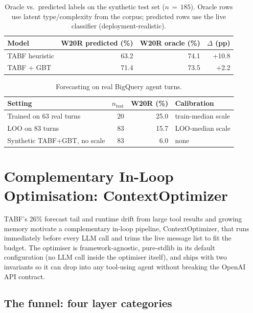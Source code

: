 \documentclass{article}
\begin{document}
\begin{table}[!htbp]
  \caption{Oracle vs.\ predicted labels on the synthetic test set ($n\,{=}\,185$).
  Oracle rows use latent type/complexity from the corpus; predicted rows use
  the live classifier (deployment-realistic).}
  \label{tab:oracle-labels}
  \centering
  \small
  \begin{tabular}{lrrr}
    \toprule
    Model & W20R predicted (\%) & W20R oracle (\%) & $\Delta$ (pp) \\
    \midrule
    TABF heuristic & 63.2 & 74.1 & +10.8 \\
    TABF + GBT     & 71.4 & 73.5 & +2.2 \\
    \bottomrule
  \end{tabular}
\end{table}

\begin{table}[!htbp]
  \caption{Forecasting on real BigQuery agent turns.}
  \label{tab:real-trace}
  \centering
  \small
  \begin{tabular}{lrrl}
    \toprule
    Setting & $n_\text{test}$ & W20R (\%) & Calibration \\
    \midrule
    Trained on 63 real turns      & 20 & 25.0 & train-median scale \\
    LOO on 83 turns               & 83 & 15.7 & LOO-median scale \\
    Synthetic TABF+GBT, no scale  & 83 &  6.0 & none \\
    \bottomrule
  \end{tabular}
\end{table}

\section{Complementary In-Loop Optimisation: ContextOptimizer}
\label{sec:optimizer}

TABF's 26\% forecast tail and runtime drift from large tool results and
growing memory motivate a complementary in-loop pipeline,
ContextOptimizer, that runs immediately before every LLM call
and trims the live message list to fit the budget. The optimiser is
framework-agnostic, pure-stdlib in its default configuration (no LLM
call inside the optimiser itself), and ships with two invariants so it
can drop into any tool-using agent without breaking the OpenAI API
contract.

\subsection{The funnel: four layer categories}
\end{document}
